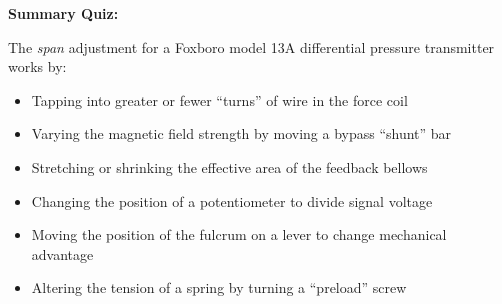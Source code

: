 \vfil \eject

\noindent
{\bf Summary Quiz:}

The {\it span} adjustment for a Foxboro model 13A differential pressure transmitter works by:

\begin{itemize}
\item{} Tapping into greater or fewer ``turns'' of wire in the force coil
\vskip 5pt
\item{} Varying the magnetic field strength by moving a bypass ``shunt'' bar
\vskip 5pt
\item{} Stretching or shrinking the effective area of the feedback bellows
\vskip 5pt
\item{} Changing the position of a potentiometer to divide signal voltage
\vskip 5pt
\item{} Moving the position of the fulcrum on a lever to change mechanical advantage
\vskip 5pt
\item{} Altering the tension of a spring by turning a ``preload'' screw
\end{itemize}






